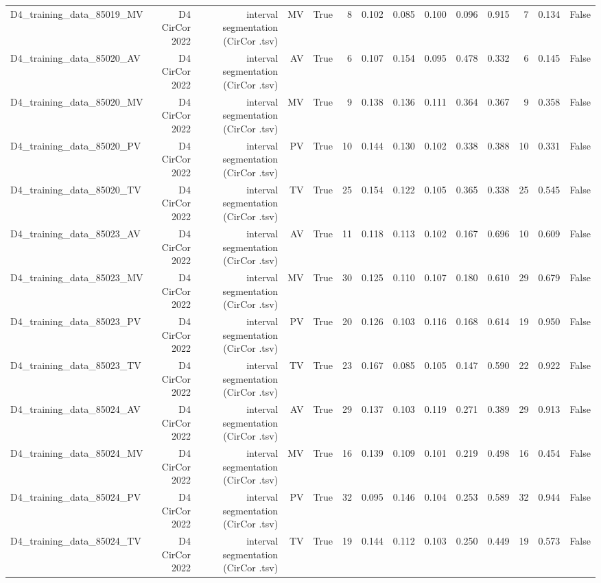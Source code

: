 \begin{table}[htbp]
\begin{tabular}{lrrrrrrrrrrrrr}
    D4\_training\_data\_85019\_MV & D4 CirCor 2022 & interval segmentation (CirCor .tsv) & MV & True & 8 & 0.102 & 0.085 & 0.100 & 0.096 & 0.915 & 7 & 0.134 & False \\
    D4\_training\_data\_85020\_AV & D4 CirCor 2022 & interval segmentation (CirCor .tsv) & AV & True & 6 & 0.107 & 0.154 & 0.095 & 0.478 & 0.332 & 6 & 0.145 & False \\
    D4\_training\_data\_85020\_MV & D4 CirCor 2022 & interval segmentation (CirCor .tsv) & MV & True & 9 & 0.138 & 0.136 & 0.111 & 0.364 & 0.367 & 9 & 0.358 & False \\
    D4\_training\_data\_85020\_PV & D4 CirCor 2022 & interval segmentation (CirCor .tsv) & PV & True & 10 & 0.144 & 0.130 & 0.102 & 0.338 & 0.388 & 10 & 0.331 & False \\
    D4\_training\_data\_85020\_TV & D4 CirCor 2022 & interval segmentation (CirCor .tsv) & TV & True & 25 & 0.154 & 0.122 & 0.105 & 0.365 & 0.338 & 25 & 0.545 & False \\
    D4\_training\_data\_85023\_AV & D4 CirCor 2022 & interval segmentation (CirCor .tsv) & AV & True & 11 & 0.118 & 0.113 & 0.102 & 0.167 & 0.696 & 10 & 0.609 & False \\
    D4\_training\_data\_85023\_MV & D4 CirCor 2022 & interval segmentation (CirCor .tsv) & MV & True & 30 & 0.125 & 0.110 & 0.107 & 0.180 & 0.610 & 29 & 0.679 & False \\
    D4\_training\_data\_85023\_PV & D4 CirCor 2022 & interval segmentation (CirCor .tsv) & PV & True & 20 & 0.126 & 0.103 & 0.116 & 0.168 & 0.614 & 19 & 0.950 & False \\
    D4\_training\_data\_85023\_TV & D4 CirCor 2022 & interval segmentation (CirCor .tsv) & TV & True & 23 & 0.167 & 0.085 & 0.105 & 0.147 & 0.590 & 22 & 0.922 & False \\
    D4\_training\_data\_85024\_AV & D4 CirCor 2022 & interval segmentation (CirCor .tsv) & AV & True & 29 & 0.137 & 0.103 & 0.119 & 0.271 & 0.389 & 29 & 0.913 & False \\
    D4\_training\_data\_85024\_MV & D4 CirCor 2022 & interval segmentation (CirCor .tsv) & MV & True & 16 & 0.139 & 0.109 & 0.101 & 0.219 & 0.498 & 16 & 0.454 & False \\
    D4\_training\_data\_85024\_PV & D4 CirCor 2022 & interval segmentation (CirCor .tsv) & PV & True & 32 & 0.095 & 0.146 & 0.104 & 0.253 & 0.589 & 32 & 0.944 & False \\
    D4\_training\_data\_85024\_TV & D4 CirCor 2022 & interval segmentation (CirCor .tsv) & TV & True & 19 & 0.144 & 0.112 & 0.103 & 0.250 & 0.449 & 19 & 0.573 & False \\

\end{tabular}
\end{table}
